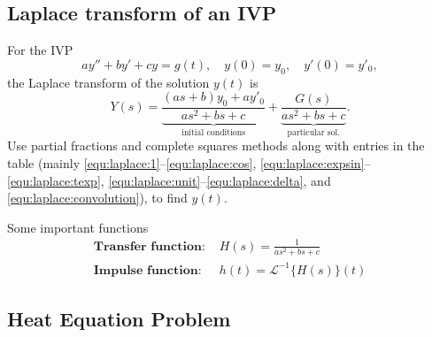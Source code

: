 \documentclass[10pt,leqno]{article}
\begin{document}
\begin{multicols}{2}
\subsection*{Laplace transform of an IVP}
For the IVP
\begin{equation}
ay''+by' +cy = g(t),\quad y(0)=y_{0}, \quad y'(0)=y'_{0},
\end{equation}
the Laplace transform of the solution $y(t)$ is
\begin{equation}Y(s)= \underbrace{\frac{(as+b)y_{0}+ay'_{0}}{as^{2}+bs+c}}_{\text{initial conditions}}+\underbrace{\frac{G(s)}{as^{2}+bs+c}}_{\text{particular sol.}}.                          
\end{equation}
Use partial fractions and complete squares methods along with entries in the table (mainly \eqref{equ:laplace:1}--\eqref{equ:laplace:cos}, \eqref{equ:laplace:expsin}--\eqref{equ:laplace:texp}, \eqref{equ:laplace:unit}--\eqref{equ:laplace:delta}, and \eqref{equ:laplace:convolution}), to find $y(t)$.

Some important functions
\begin{align}
\textbf{Transfer function:\ }& H(s)=\frac{1}{as^{2}+bs+c} \\
\textbf{Impulse function:\ }& h(t)=\mathcal{L}^{-1}\{H(s)\}(t)
\end{align}




\end{multicols}

\newpage

\begin{center}
\section*{Heat Equation Problem}
\end{center}
\end{document}
